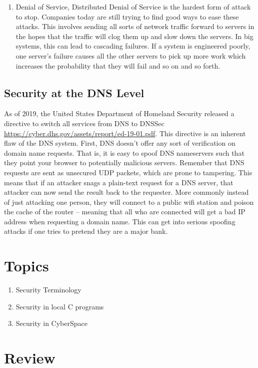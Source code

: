 \begin{enumerate}
\item Denial of Service, Distributed Denial of Service is the hardest form of attack to stop.
  Companies today are still trying to find good ways to ease these attacks.
  This involves sending all sorts of network traffic forward to servers in the hopes that the traffic will clog them up and slow down the servers.
  In big systems, this can lead to cascading failures. If a system is engineered poorly, one server's failure causes all the other servers to pick up more work which increases the probability that they will fail and so on and so forth.
\end{enumerate}

\subsection{Security at the DNS Level}

As of 2019, the United States Department of Homeland Security released a directive to switch all services from DNS to DNSSec \url{https://cyber.dhs.gov/assets/report/ed-19-01.pdf}.
This directive is an inherent flaw of the DNS system.
First, DNS doesn't offer any sort of verification on domain name requests.
That is, it is easy to spoof DNS nameservers such that they point your browser to potentially malicious servers.
Remember that DNS requests are sent as unsecured UDP packets, which are prone to tampering. This means that if an attacker snags a plain-text request for a DNS server, that attacker can now send the result back to the requester.
More commonly instead of just attacking one person, they will connect to a public wifi station and poison the cache of the router -- meaning that all who are connected will get a bad IP address when requesting a domain name.
This can get into serious spoofing attacks if one tries to pretend they are a major bank.

\section{Topics}

\begin{enumerate}
\item Security Terminology
\item Security in local C programs
\item Security in CyberSpace
\end{enumerate}

\section{Review}


